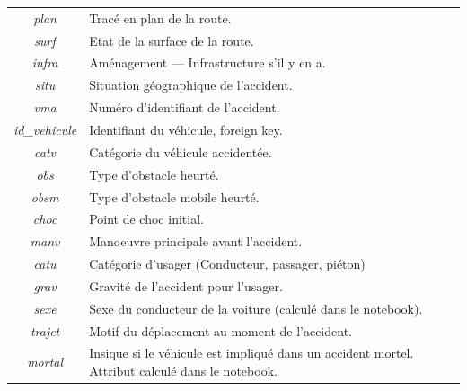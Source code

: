 \documentclass{article}
\begin{document}
\begin{center}
\begin{tabular}{ |c|p{9cm}| }
            \textit{plan} & Tracé en plan de la route. \\  
            \textit{surf} & Etat de la surface de la route. \\  
            \textit{infra} & Aménagement --- Infrastructure s'il y en a. \\  
            \textit{situ} & Situation géographique de l'accident. \\  
            \textit{vma} & Numéro d'identifiant de l'accident. \\
            \textit{id\_vehicule} & Identifiant du véhicule, foreign key. \\
            \textit{catv} & Catégorie du véhicule accidentée. \\  
            \textit{obs} & Type d'obstacle heurté. \\
            \textit{obsm} & Type d'obstacle mobile heurté. \\
            \textit{choc} & Point de choc initial. \\
            \textit{manv} & Manoeuvre principale avant l'accident. \\
            \textit{catu} & Catégorie d'usager (Conducteur, passager, piéton) \\
            \textit{grav} & Gravité de l'accident pour l'usager. \\
            \textit{sexe} & Sexe du conducteur de la voiture (calculé dans le notebook). \\
            \textit{trajet} & Motif du déplacement au moment de l'accident. \\
            \textit{mortal} & Insique si le véhicule est impliqué dans un accident mortel. Attribut calculé dans le notebook. \\
            \hline
        \end{tabular}
    \end{center}
\end{document}
